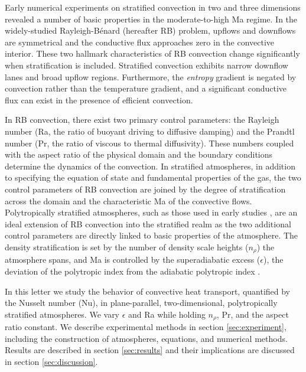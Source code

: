 \documentclass[aps, prl, twocolumn, nofootinbib, groupedaddress, amsfonts, amssymb, amsmath]{revtex4-1}
\newcommand{\RB}{Rayleigh-B\'{e}nard }
\newcommand{\nrho}{\ensuremath{n_{\rho}}}
\begin{document}
Early numerical experiments on stratified convection
in two \cite{graham1975, chan&all1982,
hurlburt&all1984, cattaneo&all1990} and three 
\cite{cattaneo&all1991, brummell&all1996} dimensions
revealed a number of basic properties in the moderate-to-high 
Ma regime. In the widely-studied \RB (hereafter RB) problem, 
upflows and downflows are symmetrical and
the conductive flux approaches zero in the convective interior.
These two hallmark characteristics of RB convection change
significantly when stratification is included.  Stratified convection 
exhibits narrow downflow lanes and broad upflow regions.
Furthermore, the \emph{entropy} gradient is negated by convection 
rather than the temperature gradient, and
a significant conductive flux can exist in the presence of
efficient convection.

In RB convection, there exist two primary control parameters: 
the Rayleigh number (Ra, the ratio of
buoyant driving to diffusive damping) and the Prandtl number 
(Pr, the ratio of viscous to thermal
diffusivity).  These numbers coupled with the aspect ratio of 
the physical domain and the boundary conditions
determine the dynamics of the convection.  In stratified atmospheres, 
in addition to specifying the equation of state and
fundamental properties of the gas, the two control parameters of 
RB convection are joined by the degree of
stratification across the domain and the characteristic 
Ma of the convective flows.  
Polytropically stratified atmospheres, such as those used in 
early studies \cite{graham1975, chan&all1982, hurlburt&all1984, 
cattaneo&all1990, cattaneo&all1991, brummell&all1996}, are an ideal extension of
RB convection into the stratified realm as the two additional 
control parameters are directly linked to
basic properties of the atmosphere.  The density stratification is 
set by the number of density scale heights (\nrho)
the atmosphere spans, and Ma is controlled 
by the superadiabatic excess ($\epsilon$),
the deviation of the polytropic index from the adiabatic polytropic 
index \cite{graham1975}.

In this letter we study the behavior of convective heat transport, 
quantified by the Nusselt number (Nu), in plane-parallel, 
two-dimensional, polytropically stratified atmospheres.  
We vary $\epsilon$ and Ra while holding $\nrho$, Pr, and the aspect ratio
constant.  We describe experimental methods in section 
\ref{sec:experiment}, including the construction of atmospheres, equations, and numerical methods.  
Results are described in section \ref{sec:results} and their implications are discussed
in section \ref{sec:discussion}.
\end{document}
